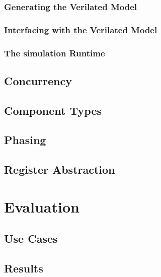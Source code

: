 \documentclass[12pt]{book}
\begin{document}
\subsection{Generating the Verilated Model} 

\subsection{Interfacing with the Verilated Model}

\subsection{The simulation Runtime} 

\section{Concurrency} %

\section{Component Types}

\section{Phasing}

\section{Register Abstraction}


\chapter{Evaluation} %

\section{Use Cases} %

\section{Results} %
\end{document}
